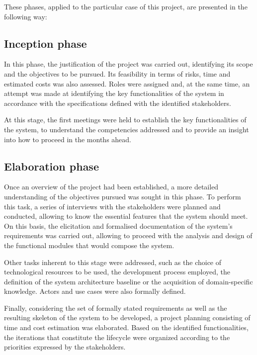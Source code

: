 These phases, applied to the particular case of this project, are presented in the following way:

\subsection{Inception phase}
\label{sec:inceptionPhase}

In this phase, the justification of the project was carried out, identifying its scope and the objectives to be pursued. Its feasibility in terms of risks, time and estimated costs was also assessed. Roles were assigned and, at the same time, an attempt was made at identifying the key functionalities of the system in accordance with the specifications defined with the identified stakeholders.

At this stage, the first meetings were held to establish the key functionalities of the system, to understand the competencies addressed and to provide an insight into how to proceed in the months ahead.

\subsection{Elaboration phase}
\label{sec:elaborationPhase}

Once an overview of the project had been established, a more detailed understanding of the objectives pursued was sought in this phase. To perform this task, a series of interviews with the stakeholders were planned and conducted, allowing to know the essential features that the system should meet. On this basis, the elicitation and formalised documentation of the system's requirements was carried out, allowing to proceed with the analysis and design of the functional modules that would compose the system.

Other tasks inherent to this stage were addressed, such as the choice of technological resources to be used, the development process employed, the definition of the system architecture baseline or the acquisition of domain-specific knowledge. Actors and use cases were also formally defined.

Finally, considering the set of formally stated requirements as well as the resulting skeleton of the system to be developed, a project planning consisting of time and cost estimation was elaborated. Based on the identified functionalities, the iterations that constitute the lifecycle were organized according to the priorities expressed by the stakeholders.

